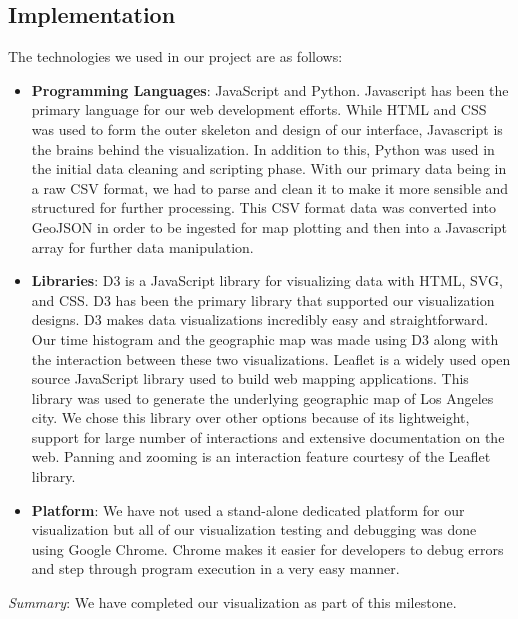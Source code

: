 \subsection{Implementation}
\label{sec:implementation}

The technologies we used in our project are as follows:

\begin{itemize}
	\item \textbf{Programming Languages}:  JavaScript and Python. Javascript has been the primary language for our web development efforts. While HTML and CSS was used to form the outer skeleton and design of our interface, Javascript is the brains behind the visualization. In addition to this, Python was used in the initial data cleaning and scripting phase.\newline
	With our primary data being in a raw CSV format, we had to parse and clean it to make it more sensible and structured for further processing. This CSV format data was converted into GeoJSON in order to be ingested for map plotting and then into a Javascript array for further data manipulation.
	\item \textbf{Libraries}: D3 is a JavaScript library for visualizing data with HTML, SVG, and CSS. D3 has been the primary library that supported our visualization designs. D3 makes data visualizations incredibly easy and straightforward. Our time histogram and the geographic map was made using D3 along with the interaction between these two visualizations.\newline
	Leaflet is a widely used open source JavaScript library used to build web mapping applications. This library was used to generate the underlying geographic map of Los Angeles city. We chose this library over other options because of its lightweight, support for large number of interactions and extensive documentation on the web. Panning and zooming is an interaction feature courtesy of the Leaflet library.
	\item \textbf{Platform}: We have not used a stand-alone dedicated platform for our visualization but all of our visualization testing and debugging was done using Google Chrome. Chrome makes it easier for developers to debug errors and step through program execution in a very easy manner.
\end{itemize}

\textit{Summary}: We have completed our visualization as part of this milestone.
